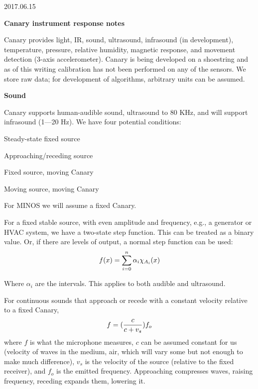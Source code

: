 \documentclass[11pt]{letter} %
\begin{document}
2017.06.15

\textbf{Canary instrument response notes} 

Canary provides light, IR, sound, ultrasound, infrasound (in development), temperature, pressure, relative humidity, magnetic response, and movement detection (3-axis accelerometer). Canary is being developed on a shoestring and as of this writing calibration  has not been performed on any of the sensors. We store raw data; for development of algorithms, arbitrary units can be assumed.

\vspace{30 pt}

\textbf{Sound}

Canary supports human-audible sound, ultrasound to 80 KHz, and will support infrasound (1---20 Hz). We have four potential conditions:
\renewcommand\labelitemi{\tiny$\bullet$}
\begin{enumerate*}  
\item Steady-state fixed source 
\item Approaching/receding source 
\item Fixed source, moving Canary 
\item Moving source, moving Canary
\end{enumerate*}

For MINOS we will assume a fixed Canary. 

For a fixed stable source, with even amplitude and frequency, e.g., a generator or HVAC system, we have a two-state step function. This can be treated as a binary value. Or, if there are levels of output, a normal step function can be used:
\begin{equation}
\centering
f(x) = \sum_{i=0}^{n} \alpha_i \chi_{A_i} (x)
\end{equation}

Where \(\alpha_i\) are the intervals. This applies to both audible and ultrasound.

For continuous sounds that approach or recede with a constant velocity relative to a fixed Canary,
\begin{equation}
\centering
f = (\frac{c}{c + v_s})f_o
\end{equation}
\textellipsis where \(f\) is what the microphone measures, \(c\) can be assumed constant for us (velocity of waves in the medium, air, which will vary some but not enough to make much difference), \(v_s\) is the velocity of the source (relative to the fixed receiver), and \(f_o\) is the emitted frequency. Approaching compresses waves, raising frequency, receding expands them, lowering it. 
\end{document}

